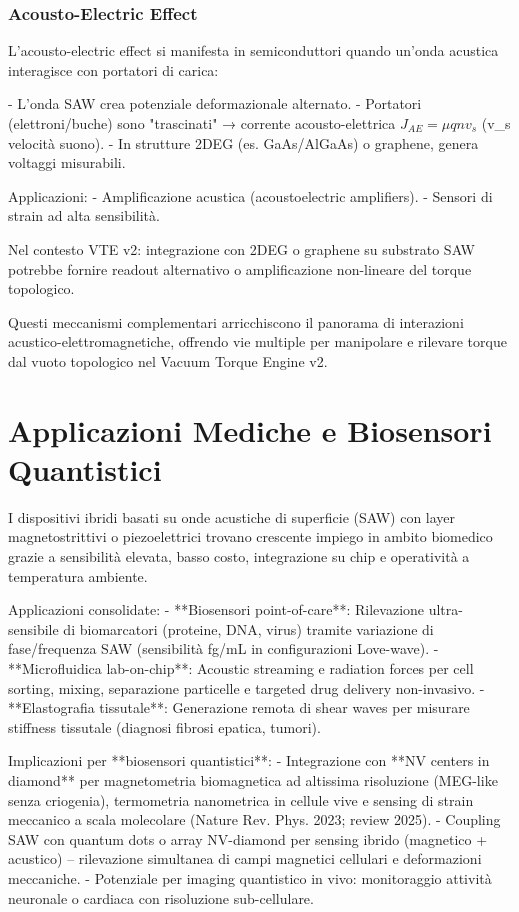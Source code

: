 \documentclass[11pt,a4paper]{article}
\begin{document}
\subsubsection{Acousto-Electric Effect}

L'acousto-electric effect si manifesta in semiconduttori quando un'onda acustica interagisce con portatori di carica:

- L'onda SAW crea potenziale deformazionale alternato.
- Portatori (elettroni/buche) sono "trascinati" → corrente acousto-elettrica $J_{AE} = \mu q n v_s$ (v_s velocità suono).
- In strutture 2DEG (es. GaAs/AlGaAs) o graphene, genera voltaggi misurabili.

Applicazioni:
- Amplificazione acustica (acoustoelectric amplifiers).
- Sensori di strain ad alta sensibilità.

Nel contesto VTE v2: integrazione con 2DEG o graphene su substrato SAW potrebbe fornire readout alternativo o amplificazione non-lineare del torque topologico.

Questi meccanismi complementari arricchiscono il panorama di interazioni acustico-elettromagnetiche, offrendo vie multiple per manipolare e rilevare torque dal vuoto topologico nel Vacuum Torque Engine v2.


\section{Applicazioni Mediche e Biosensori Quantistici}

I dispositivi ibridi basati su onde acustiche di superficie (SAW) con layer magnetostrittivi o piezoelettrici trovano crescente impiego in ambito biomedico grazie a sensibilità elevata, basso costo, integrazione su chip e operatività a temperatura ambiente.

Applicazioni consolidate:
- **Biosensori point-of-care**: Rilevazione ultra-sensibile di biomarcatori (proteine, DNA, virus) tramite variazione di fase/frequenza SAW (sensibilità fg/mL in configurazioni Love-wave).
- **Microfluidica lab-on-chip**: Acoustic streaming e radiation forces per cell sorting, mixing, separazione particelle e targeted drug delivery non-invasivo.
- **Elastografia tissutale**: Generazione remota di shear waves per misurare stiffness tissutale (diagnosi fibrosi epatica, tumori).

Implicazioni per **biosensori quantistici**:
- Integrazione con **NV centers in diamond** per magnetometria biomagnetica ad altissima risoluzione (MEG-like senza criogenia), termometria nanometrica in cellule vive e sensing di strain meccanico a scala molecolare (Nature Rev. Phys. 2023; review 2025).
- Coupling SAW con quantum dots o array NV-diamond per sensing ibrido (magnetico + acustico) – rilevazione simultanea di campi magnetici cellulari e deformazioni meccaniche.
- Potenziale per imaging quantistico in vivo: monitoraggio attività neuronale o cardiaca con risoluzione sub-cellulare.
\end{document}
